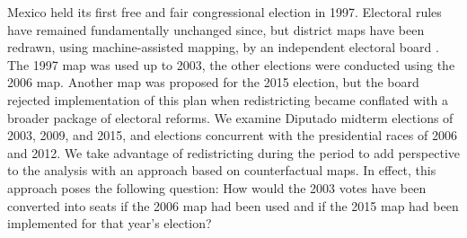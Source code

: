 \documentclass[letter,12pt]{article}
\begin{document}
Mexico held its first free and fair congressional election in 1997. Electoral rules have remained fundamentally unchanged since, but district maps have been redrawn, using machine-assisted mapping, by an independent electoral board \citep{lujambio.vives.2008,trelles.mtz.polygob2012}. The 1997 map was used up to 2003, the other elections were conducted using the 2006 map. Another map was proposed for the 2015 election, but the board rejected implementation of this plan when redistricting became conflated with a broader package of electoral reforms. We examine Diputado midterm elections of 2003, 2009, and 2015, and elections concurrent with the presidential races of 2006 and 2012. We take advantage of redistricting during the period to add perspective to the analysis with an approach based on counterfactual maps. In effect, this approach poses the following question: How would the 2003 votes have been converted into seats if the 2006 map had been used and if the 2015 map had been implemented for that year's election? 
\end{document}
